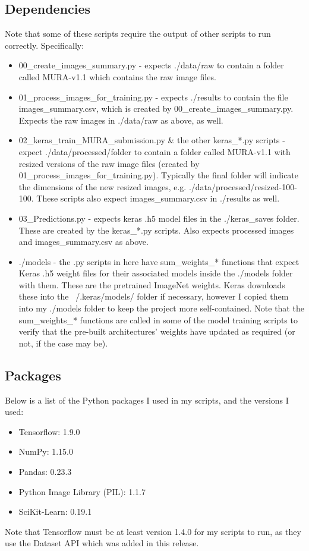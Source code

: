 \documentclass[11pt]{article} %
\theoremstyle{plain}
\theoremstyle{definition}
\begin{document}
\subsection{Dependencies}
Note that some of these scripts require the output of other scripts to run correctly. Specifically:
\begin{itemize}
\item 00\_create\_images\_summary.py - expects ./data/raw to contain a folder called MURA-v1.1 which contains the raw image files.
\item 01\_process\_images\_for\_training.py - expects ./results to contain the file images\_summary.csv, which is created by 00\_create\_images\_summary.py. Expects the raw images in ./data/raw as above, as well.
\item 02\_keras\_train\_MURA\_submission.py \& the other keras\_*.py scripts - expect ./data/processed/{folder} to contain a folder called MURA-v1.1 with resized versions of the raw image files (created by 01\_process\_images\_for\_training.py). Typically the final {folder} will indicate the dimensions of the new resized images, e.g. ./data/processed/resized-100-100. These scripts also expect images\_summary.csv in ./results as well.
\item 03\_Predictions.py - expects keras .h5 model files in the ./keras\_saves folder. These are created by the keras\_*.py scripts. Also expects processed images and images\_summary.csv as above.
\item ./models - the .py scripts in here have sum\_weights\_* functions that expect Keras .h5 weight files for their associated models inside the ./models folder with them. These are the pretrained ImageNet weights. Keras downloads these into the ~/.keras/models/ folder if necessary, however I copied them into my ./models folder to keep the project more self-contained. Note that the sum\_weights\_* functions are called in some of the model training scripts to verify that the pre-built architectures' weights have updated as required (or not, if the case may be).
\end{itemize}


\subsection{Packages}
Below is a list of the Python packages I used in my scripts, and the versions I used:
\begin{itemize}
\item Tensorflow: 1.9.0
\item NumPy: 1.15.0
\item Pandas: 0.23.3
\item Python Image Library (PIL): 1.1.7
\item SciKit-Learn: 0.19.1
\end{itemize}
Note that Tensorflow must be at least version 1.4.0 for my scripts to run, as they use the Dataset API which was added in this release.
\end{document}
